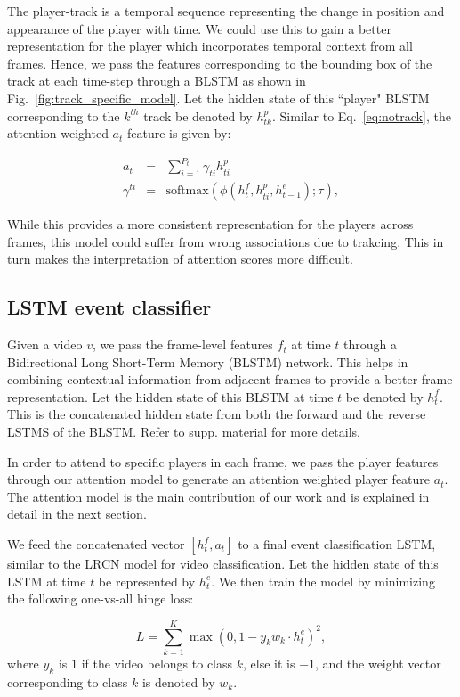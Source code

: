 {The player-track is a temporal sequence representing the change in position and
appearance of the player with time.  We could use this to gain a better
representation for the player which incorporates temporal context from all
frames. Hence, we pass the features corresponding to the bounding box of the
track at each time-step through a BLSTM as shown in
Fig.~\ref{fig:track_specific_model}. Let the hidden state of this ``player"
BLSTM corresponding to the $k^{th}$ track be denoted by $h^p_{tk}$. Similar to
Eq.~\ref{eq:notrack}, the attention-weighted $a_t$ feature is given by:

\begin{eqnarray}
  a_t & = & \sum_{i=1}^{P_t} \gamma_{ti} h^p_{ti} \\ \nonumber
  \gamma^{ti} & = & \text{softmax} \left(\phi\left(h^f_t, h^p_{ti}, h^e_{t-1}\right); \tau\right),
\end{eqnarray}

While this provides a more consistent representation for the players across frames,
this model could suffer from wrong associations due to trakcing. This in turn makes
the interpretation of attention scores more difficult.


\subsection{LSTM event classifier}
Given a video $v$, we pass the frame-level features $f_t$ at time $t$ through a
Bidirectional Long Short-Term Memory (BLSTM) network. This helps in combining
contextual information from adjacent frames to provide a better frame
representation.  Let the hidden state of this BLSTM at time $t$ be denoted by
$h^f_t$.  This is the concatenated hidden state from both the forward and the
reverse LSTMS of the BLSTM. Refer to supp.  material for more details.

In order to attend to specific players in each frame, we pass the player features
through our attention model to generate an attention weighted player feature
$a_t$. The attention model is the main contribution of our work
and is explained in detail in the next section.

We feed the concatenated vector $[h^f_t, a_t]$ to a final event classification
LSTM, similar to the LRCN \cite{} model for video classification. Let
the hidden state of this LSTM at time $t$ be represented by $h^e_t$.  We then
train the model by minimizing the following one-vs-all hinge loss:

\begin{equation}
  L = \sum_{k = 1}^K \max (0, 1 - y_k w_k \cdot h^e_t)^2,
\end{equation} where $y_k$ is $1$ if the video belongs to class $k$,
else it is $-1$, and the weight vector corresponding to
class $k$ is denoted by $w_k$.
}

